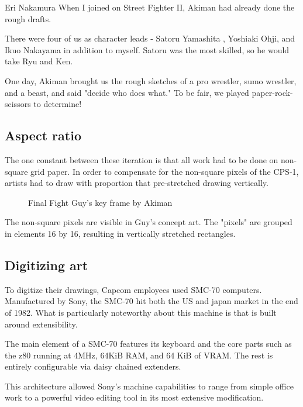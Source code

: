 \begin{q}{Eri Nakamura}
When I joined on Street Fighter II, Akiman had already done the rough drafts. 

There were four of us as character leads - Satoru Yamashita , Yoshiaki Ohji, and Ikuo Nakayama in addition to myself. Satoru was the most skilled, so he would take Ryu and Ken. 

One day, Akiman brought us the rough sketches of a pro wrestler, sumo wrestler, and a beast, and said "decide who does what." To be fair, we played paper-rock-scissors to determine!
\end{q}





\subsection{Aspect ratio}
The one constant between these iteration is that all work had to be done on non-square grid paper. In order to compensate for the non-square pixels of the CPS-1, artists had to draw with proportion that pre-stretched drawing vertically. 

\begin{figure}[H]
\caption*{Final Fight Guy's key frame by Akiman}
\label{ff_design}
\end{figure}

The non-square pixels are visible in Guy's concept art. The "pixels" are grouped in elements 16 by 16, resulting in vertically stretched rectangles.





\subsection{Digitizing art}

To digitize their drawings, Capcom employees used SMC-70 computers. Manufactured by Sony, the SMC-70 hit both the US and japan market in the end of 1982. What is particularly noteworthy about this machine is that is built around extensibility. 

The main element of a SMC-70 features its keyboard and the core parts such as the z80 running at 4MHz, 64KiB RAM, and 64 KiB of VRAM. The rest is entirely configurable via daisy chained extenders. 

This architecture allowed Sony's machine capabilities to range from simple office work to a powerful video editing tool in its most extensive modification. 

